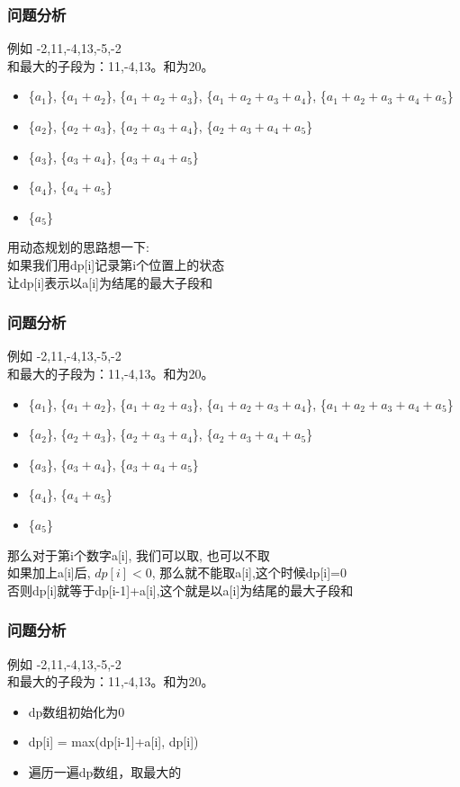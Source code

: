 \documentclass{beamer}
\begin{document}
\begin{frame}[fragile]
\frametitle{问题分析}
\begin{block}{例如}
	-2,11,-4,13,-5,-2\\
	和最大的子段为：11,-4,13。和为20。 
\end{block}
\begin{itemize} \scriptsize
	\item \{$a_1$\}, \{$a_1+a_2$\}, \{$a_1+a_2+a_3$\}, \{$a_1+a_2+a_3+a_4$\}, \{$a_1+a_2+a_3+a_4+a_5$\} 
	\item \{$ a_2$\}, \{$ a_2+a_3$\}, \{$a_2+a_3+a_4$\}, \{$a_2+a_3+a_4+a_5$\} 
	\item \{$ a_3$\}, \{$ a_3+a_4$\}, \{$ a_3+a_4+a_5$\} 
	\item \{$a_4$\}, \{$a_4+a_5$\}
	\item \{$a_5$\} 
\end{itemize}
用动态规划的思路想一下:\\
如果我们用dp[i]记录第i个位置上的状态\\
让dp[i]表示以a[i]为结尾的最大子段和
\end{frame}

\begin{frame}[fragile]
\frametitle{问题分析}
\begin{block}{例如}
	-2,11,-4,13,-5,-2\\
	和最大的子段为：11,-4,13。和为20。 
\end{block}
\begin{itemize} \scriptsize
	\item \{$a_1$\}, \{$a_1+a_2$\}, \{$a_1+a_2+a_3$\}, \{$a_1+a_2+a_3+a_4$\}, \{$a_1+a_2+a_3+a_4+a_5$\} 
	\item \{$ a_2$\}, \{$ a_2+a_3$\}, \{$a_2+a_3+a_4$\}, \{$a_2+a_3+a_4+a_5$\} 
	\item \{$ a_3$\}, \{$ a_3+a_4$\}, \{$ a_3+a_4+a_5$\} 
	\item \{$a_4$\}, \{$a_4+a_5$\}
	\item \{$a_5$\} 
\end{itemize}

那么对于第i个数字a[i], 我们可以取, 也可以不取\\
如果加上a[i]后, $dp[i]<0$, 那么就不能取a[i],这个时候dp[i]=0 \\
否则dp[i]就等于dp[i-1]+a[i],这个就是以a[i]为结尾的最大子段和
\end{frame}


\begin{frame}[fragile]
\frametitle{问题分析}
\begin{block}{例如}
	-2,11,-4,13,-5,-2\\
	和最大的子段为：11,-4,13。和为20。
\end{block}
\begin{itemize}
	\item dp数组初始化为0
	\item dp[i] = max(dp[i-1]+a[i], dp[i])
	\item 遍历一遍dp数组，取最大的
\end{itemize}
	
\end{frame}
\end{document}
